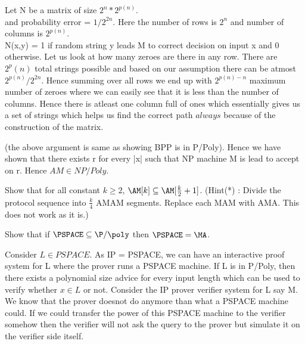\documentclass[12pt]{exam}
\begin{document}
\begin{questions}
\begin{solution}
Let N be a matrix of size $2^n*2^{p(n)}$.\\
and probability error = $1/2^{2n}$.
Here the number of rows is $2^n$ and number of columns is $2^{p(n)}$.\\
N(x,y) = 1 if random string y leads M to correct decision on input x
and 0 otherwise.
Let us look at how many zeroes are there in any row. There are $2^p(n)$ total strings possible and based on our assumption there can be atmost $2^{p(n)}/2^{2n}$.
Hence summing over all rows we end up with $2^{p(n) - n}$ maximum number of zeroes
where we can easily see that it is less than the number of columns. Hence there is
atleast one column full of ones which essentially gives us a set of strings which
helps us find the correct path $always$ because of the construction of the matrix.

(the above argument is same as showing BPP is in P/Poly).
Hence we have shown that there exists r for every |x| such that NP machine M
is lead to accept on r. Hence $AM \in NP/Poly$.


\end{solution}
\question[10]
Show that for all constant $k \ge 2$, $\AM[k] \subseteq \AM[\frac{k}{2}+1]$. (Hint(*) : Divide the protocol sequence into $\frac{k}{4}$ AMAM segments. Replace each MAM with AMA. This does not work as it is.)

\question[10]
Show that if $\PSPACE \subseteq \P/\poly$ then $\PSPACE = \MA$.
\begin{solution}
Consider $L \in PSPACE$. As IP = PSPACE, we can have an interactive
proof system for L where the prover runs a PSPACE machine. If L is in P/Poly,
then there exists a polynomial size advice for every input length which
can be used to verify whether $x \in L$ or not. Consider the IP prover
verifier system for L say M. We know that the prover doesnot do anymore than
what a PSPACE machine could. If we could transfer the power of this
PSPACE machine to the verifier somehow then the verifier will not ask
the query to the prover but simulate it on the verifier side itself.\\


\end{solution}
\end{questions}
\end{document}
